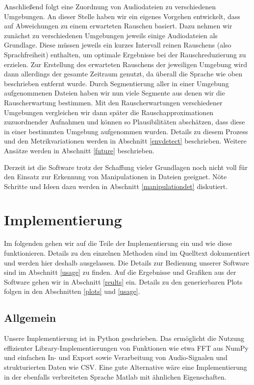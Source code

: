 \documentclass[
	fontsize=10.5pt,
	marginpar=false,
	ngerman,
	accentcolor=3d
	]{tudapub}
\begin{document}
Anschließend folgt eine Zuordnung von Audiodateien zu verschiedenen Umgebungen. An dieser Stelle haben wir ein eigenes Vorgehen entwickelt, dass auf Abweichungen zu einem erwarteten Rauschen basiert. Dazu nehmen wir zunächst zu verschiedenen Umgebungen jeweils einige Audiodateien als Grundlage. Diese müssen jeweils ein kurzes Intervall reinen Rauschens (also Sprachfreiheit) enthalten, um optimale Ergebnisse bei der Rauschreduzierung zu erzielen. Zur Erstellung des erwarteten Rauschens der jeweiligen Umgebung wird dann allerdings der gesamte Zeitraum genutzt, da überall die Sprache wie oben beschrieben entfernt wurde. Durch Segmentierung aller in einer Umgebung aufgenommenen Dateien haben wir nun viele Segmente aus denen wir die Rauscherwartung bestimmen. Mit den Rauscherwartungen verschiedener Umgebungen vergleichen wir dann später die Rauschapproximationen zuzuordnender Aufnahmen und können so Plausibilitäten abschätzen, dass diese in einer bestimmten Umgebung aufgenommen wurden. Details zu diesem Prozess und den Metrikvariationen werden in Abschnitt \ref{envdetect} beschrieben. Weitere Ansätze werden in Abschnitt \ref{future} beschrieben.

Derzeit ist die Software trotz der Schaffung vieler Grundlagen noch nicht voll für den Einsatz zur Erkennung von Manipulationen in Dateien geeignet. Nöte Schritte und Ideen dazu werden in Abschnitt \ref{manipulationdet} diskutiert.

\pagebreak
\section{Implementierung}
Im folgenden gehen wir auf die Teile der Implementierung ein und wie diese funktionieren. Details zu den einzelnen Methoden sind im Quelltext dokumentiert und werden hier deshalb ausgelassen. Die Details zur Bedienung unserer Software sind im Abschnitt \ref{usage} zu finden. Auf die Ergebnisse und Grafiken aus der Software gehen wir in Abschnitt \ref{reults} ein. Details zu den generierbaren Plots folgen in den Abschnitten \ref{plots} und \ref{usage}.

\subsection{Allgemein}

Unsere Implementierung ist in Python geschrieben. Das ermöglicht die Nutzung effizienter Library-Implementierungen von Funktionen wie etwa FFT aus NumPy und einfachen In- und Export sowie Verarbeitung von Audio-Signalen und strukturierten Daten wie CSV. Eine gute Alternative wäre eine Implementierung in der ebenfalls verbreiteten Sprache Matlab mit ähnlichen Eigenschaften.
\end{document}
